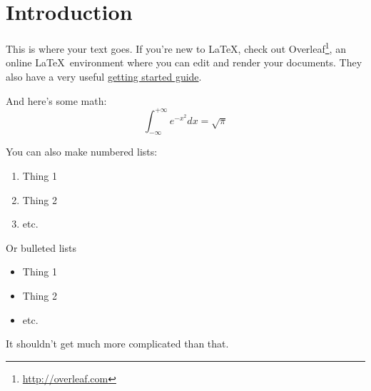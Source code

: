 \section{Introduction}
This is where your text goes.
If you're new to \LaTeX, check out Overleaf\footnote{\url{http://overleaf.com}}, an online \LaTeX~environment where you can edit and render your documents.
They also have a very useful \href{http://www.overleaf.com/help/18-how-do-i-use-overleaf}{getting started guide}.

And here's some math:
\begin{equation}
  \int_{-\infty}^{+\infty} e^{-x^2} dx = \sqrt{\pi}
\end{equation}

You can also make numbered lists:
\begin{enumerate}
  \item Thing 1
  \item Thing 2
  \item etc.
\end{enumerate}

Or bulleted lists
\begin{itemize}
  \item Thing 1
  \item Thing 2
  \item etc.
\end{itemize}

It shouldn't get much more complicated than that.
